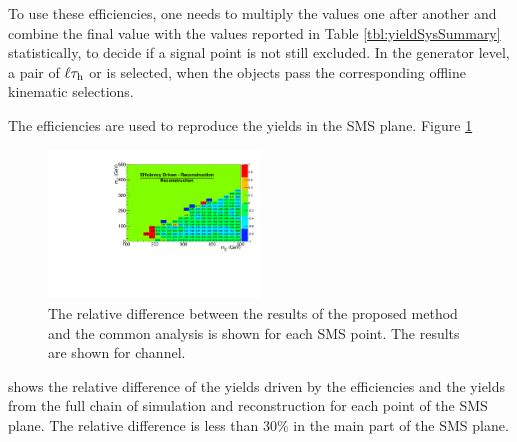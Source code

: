 To use these efficiencies, one needs to multiply the values one after another and combine the final value with the values reported in Table \ref{tbl:yieldSysSummary}  statistically, to decide if a signal point is not still excluded. 
In the generator level, a pair of $\ell\tau_{\rm h}$ or \tauTau is selected, when the \visTau objects pass
the corresponding offline kinematic selections.


The efficiencies are used to reproduce the yields in the SMS plane. 
Figure \ref{fig:NormalizedDiff}
\begin{figure}[!Hhtb]
\centering
\includegraphics[width=0.5\textwidth,keepaspectratio=true]{ModelTesting/NormalizedDiffmuTau.pdf}
\caption{The relative difference between the results of the proposed method and the common analysis is shown for each SMS point. The results are shown for \muTau channel.}
\label{fig:NormalizedDiff}
\end{figure}
shows the relative difference of the yields driven by the
efficiencies and the yields from the full chain of simulation and reconstruction for each point of the SMS plane. The relative
difference is less than 30\% in the main part of the SMS plane.